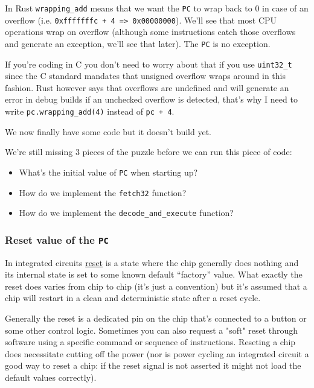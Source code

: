 \documentclass{article}
\begin{document}
In Rust \texttt{wrapping\_add} means that we want the \texttt{PC} to
wrap back to 0 in case of an overflow (i.e. \texttt{0xfffffffc + 4 =>
0x00000000}). We'll see that most CPU operations wrap on overflow
(although some instructions catch those overflows and generate an
exception, we'll see that later). The \texttt{PC} is no exception.

If you're coding in C you don't need to worry about that if you use
\texttt{uint32\_t} since the C standard mandates that unsigned overflow wraps
around in this fashion. Rust however says that overflows are undefined
and will generate an error in debug builds if an unchecked overflow is
detected, that's why I need to write \texttt{pc.wrapping\_add(4)} instead of
\texttt{pc + 4}.

We now finally have some code but it doesn't build yet.

We're still missing 3 pieces of the puzzle before we can run this
piece of code:

\begin{itemize}
 \item What's the initial value of \texttt{PC} when starting up?
 \item How do we implement the \texttt{fetch32} function?
 \item How do we implement the \texttt{decode\_and\_execute} function?
\end{itemize}

\subsubsection{Reset value of the \texttt{PC}}

In integrated circuits
\href{https://en.wikipedia.org/wiki/Reset_%28computing%29}{reset} is a
state where the chip generally does nothing and its internal state
is set to some known default ``factory'' value. What exactly the
reset does varies from chip to chip (it's just a convention) but
it's assumed that a chip will restart in a clean and deterministic
state after a reset cycle.

Generally the reset is a dedicated pin on the chip that's connected to
a button or some other control logic. Sometimes you can also request a
"soft" reset through software using a specific command or sequence of
instructions. Reseting a chip does necessitate cutting off the power
(nor is power cycling an integrated circuit a good way to reset a
chip: if the reset signal is not asserted it might not load the
default values correctly).
\end{document}
